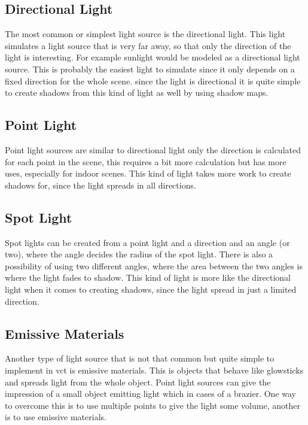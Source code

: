 \subsection{Directional Light}

The most common or simplest light source is the directional light. This light simulates a light source that is very far away, so that only the direction of the light is interesting. For example sunlight would be modeled as a directional light source. This is probably the easiest light to simulate since it only depends on a fixed direction for the whole scene. since the light is directional it is quite simple to create shadows from this kind of light as well by using shadow maps.

\subsection{Point Light}

Point light sources are similar to directional light only the direction is calculated for each point in the scene, this requires a bit more calculation but has more uses, especially for indoor scenes. This kind of light takes more work to create shadows for, since the light spreads in all directions.

\subsection{Spot Light}

Spot lights can be created from a point light and a direction and an angle (or two), where the angle decides the radius of the spot light. There is also a possibility of using two different angles, where the area between the two angles is where the light fades to shadow. This kind of light is more like the directional light when it comes to creating shadows, since the light spread in just a limited direction.

\subsection{Emissive Materials}

Another type of light source that is not that common but quite simple to implement in \gls{vct} is emissive materials. This is objects that behave like glowsticks and spreads light from the whole object. Point light sources can give the impression of a small object emitting light which in cases of a brazier. One way to overcome this is to use multiple points to give the light some volume, another is to use emissive materials.

